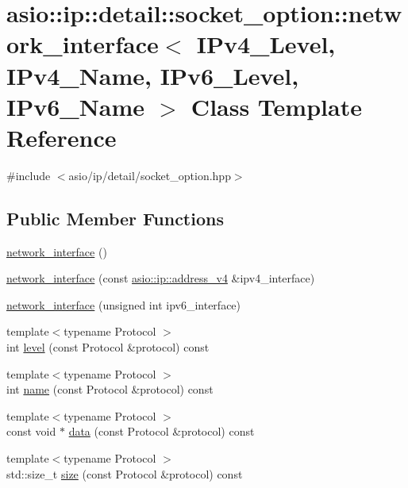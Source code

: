 \hypertarget{classasio_1_1ip_1_1detail_1_1socket__option_1_1network__interface}{}\section{asio\+:\+:ip\+:\+:detail\+:\+:socket\+\_\+option\+:\+:network\+\_\+interface$<$ I\+Pv4\+\_\+\+Level, I\+Pv4\+\_\+\+Name, I\+Pv6\+\_\+\+Level, I\+Pv6\+\_\+\+Name $>$ Class Template Reference}
\label{classasio_1_1ip_1_1detail_1_1socket__option_1_1network__interface}


{\ttfamily \#include $<$asio/ip/detail/socket\+\_\+option.\+hpp$>$}

\subsection*{Public Member Functions}
\begin{DoxyCompactItemize}
\item 
\hyperlink{classasio_1_1ip_1_1detail_1_1socket__option_1_1network__interface_aa38869b26720ed37ae356c98c19ab181}{network\+\_\+interface} ()
\item 
\hyperlink{classasio_1_1ip_1_1detail_1_1socket__option_1_1network__interface_a949aad0c3543c091c46925a1b0a193ae}{network\+\_\+interface} (const \hyperlink{classasio_1_1ip_1_1address__v4}{asio\+::ip\+::address\+\_\+v4} \&ipv4\+\_\+interface)
\item 
\hyperlink{classasio_1_1ip_1_1detail_1_1socket__option_1_1network__interface_addde23815ff7aaae4c6896eb719ff459}{network\+\_\+interface} (unsigned int ipv6\+\_\+interface)
\item 
{\footnotesize template$<$typename Protocol $>$ }\\int \hyperlink{classasio_1_1ip_1_1detail_1_1socket__option_1_1network__interface_a5ec8d42ea67bd17a202219c7ccf5b440}{level} (const Protocol \&protocol) const 
\item 
{\footnotesize template$<$typename Protocol $>$ }\\int \hyperlink{classasio_1_1ip_1_1detail_1_1socket__option_1_1network__interface_a0834a8dc3fb5bd3e51a81cff19cfa397}{name} (const Protocol \&protocol) const 
\item 
{\footnotesize template$<$typename Protocol $>$ }\\const void $\ast$ \hyperlink{classasio_1_1ip_1_1detail_1_1socket__option_1_1network__interface_a58ce502edfd83e9f6f4218d2f5600801}{data} (const Protocol \&protocol) const 
\item 
{\footnotesize template$<$typename Protocol $>$ }\\std\+::size\+\_\+t \hyperlink{classasio_1_1ip_1_1detail_1_1socket__option_1_1network__interface_aa6ec3b77c0273e9b17ca46344bbed5e7}{size} (const Protocol \&protocol) const 
\end{DoxyCompactItemize}


